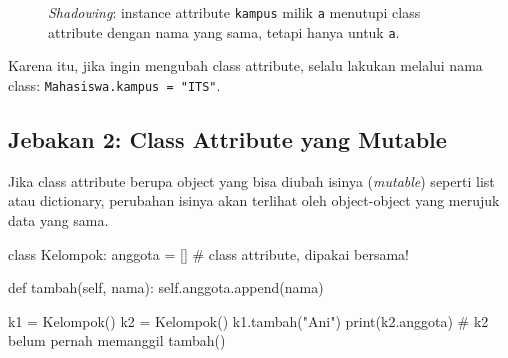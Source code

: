 \begin{figure}[htbp]
\centering
{}
\caption{\emph{Shadowing}: instance attribute \texttt{kampus} milik \texttt{a} menutupi class attribute dengan nama yang sama, tetapi hanya untuk \texttt{a}.}
\label{fig:b1-shadowing}
\end{figure}

Karena itu, jika ingin mengubah class attribute, selalu lakukan melalui nama class: \texttt{Mahasiswa.kampus = "ITS"}.

\subsection{Jebakan 2: Class Attribute yang Mutable}

Jika class attribute berupa object yang bisa diubah isinya (\emph{mutable}) seperti list atau dictionary, perubahan isinya akan terlihat oleh object-object yang merujuk data yang sama.

\begin{kode}
class Kelompok:
    anggota = []                   # class attribute, dipakai bersama!

    def tambah(self, nama):
        self.anggota.append(nama)

k1 = Kelompok()
k2 = Kelompok()
k1.tambah("Ani")
print(k2.anggota)                  # k2 belum pernah memanggil tambah()
\end{kode}

